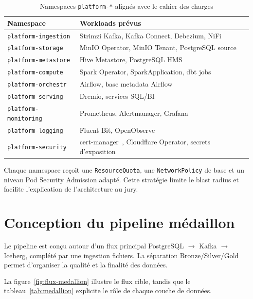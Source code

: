 \begin{table}[H]
\centering
\caption{Namespaces \texttt{platform-*} alignés avec le cahier des charges}
\label{tab:namespaces}
\small
\begin{tabular}{@{}p{}p{}@{}}
\toprule
\textbf{Namespace} & \textbf{Workloads prévus} \\
\midrule
\texttt{platform-ingestion} & Strimzi Kafka, Kafka Connect, Debezium, NiFi \\
\texttt{platform-storage} & MinIO Operator, MinIO Tenant, PostgreSQL source \\
\texttt{platform-metastore} & Hive Metastore, PostgreSQL HMS \\
\texttt{platform-compute} & Spark Operator, SparkApplication, dbt jobs \\
\texttt{platform-orchestr} & Airflow, base metadata Airflow \\
\texttt{platform-serving} & Dremio, services SQL/BI \\
\texttt{platform-monitoring} & Prometheus, Alertmanager, Grafana \\
\texttt{platform-logging} & Fluent Bit, OpenObserve \\
\texttt{platform-security} & cert-manager~\cite{cert-manager}, Cloudflare Operator, secrets d'exposition \\
\bottomrule
\end{tabular}
\end{table}

Chaque namespace reçoit une \texttt{ResourceQuota}, une \texttt{NetworkPolicy} de base et un niveau Pod Security Admission adapté. Cette stratégie limite le blast radius et facilite l'explication de l'architecture au jury.

\section{Conception du pipeline médaillon}

Le pipeline est conçu autour d'un flux principal PostgreSQL $\rightarrow$ Kafka $\rightarrow$ Iceberg, complété par une ingestion fichiers. La séparation Bronze/Silver/Gold permet d'organiser la qualité et la finalité des données.

La figure~\ref{fig:flux-medallion} illustre le flux cible, tandis que le tableau~\ref{tab:medallion} explicite le rôle de chaque couche de données.

